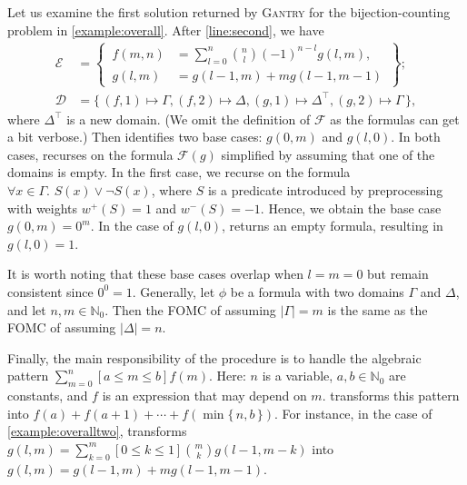 \documentclass[a4paper,UKenglish,cleveref, autoref, thm-restate]{lipics-v2021}
\newcommand{\Cranetwo}{\textsc{Gantry}}
\begin{document}

\begin{example}\label{example:overalltwo}
  Let us examine the first solution returned by \Cranetwo{} for the
  bijection-counting problem in \cref{example:overall}. After
  \autoref{line:second}, we have
  \begin{align*}
    \mathcal{E} &= \left\{\,\begin{aligned}f(m, n) &= \sum_{l=0}^{n} \binom{n}{l}{(-1)}^{n-l}g(l, m),\\ g(l, m) &= g(l-1, m) + mg(l-1, m-1)\end{aligned}\,\right\};\\
    \mathcal{D} &= \{\, (f, 1) \mapsto \Gamma, (f, 2) \mapsto \Delta, (g, 1) \mapsto \Delta^{\top}, (g, 2) \mapsto \Gamma \,\},
  \end{align*}
  where $\Delta^{\top}$ is a new domain. (We omit the definition of
  $\mathcal{F}$ as the formulas can get a bit verbose.) Then \FindBaseCases
  identifies two base cases: $g(0, m)$ and $g(l, 0)$. In both cases,
  \CompileWithBaseCases recurses on the formula $\mathcal{F}(g)$ simplified by
  assuming that one of the domains is empty. In the first case, we recurse on
  the formula $\forall x \in \Gamma\text{. }S(x) \lor \neg S(x)$, where $S$ is a
  predicate introduced by preprocessing with weights $w^{+}(S) = 1$ and
  $w^{-}(S) = -1$. Hence, we obtain the base case $g(0, m) = 0^{m}$. In the case
  of $g(l, 0)$,  returns an empty formula,
  resulting in $g(l, 0) = 1$.
\end{example}

It is worth noting that these base cases overlap when $l = m = 0$ but remain
consistent since $0^{0} = 1$. Generally, let $\phi$ be a formula with two
domains $\Gamma$ and $\Delta$, and let $n, m \in \mathbb{N}_{0}$. Then the FOMC
of  assuming $|\Gamma| = m$ is the same as the
FOMC of  assuming $|\Delta| = n$.

Finally, the main responsibility of the \Simplify procedure is to handle the
algebraic pattern $\sum_{m=0}^{n}[a \le m \le b] f(m)$. Here: $n$ is a variable,
$a, b \in \mathbb{N}_{0}$ are constants, and $f$ is an expression that may
depend on $m$. \Simplify transforms this pattern into
$f(a) + f(a+1) + \cdots + f(\min\{\, n, b \,\})$. For instance, in the case of
\cref{example:overalltwo}, \Simplify transforms
$g(l, m) = \sum_{k=0}^{m}[0 \le k \le 1]\binom{m}{k}g(l-1, m-k)$ into
$g(l, m) = g(l-1, m) + mg(l-1, m-1)$.
\end{document}
